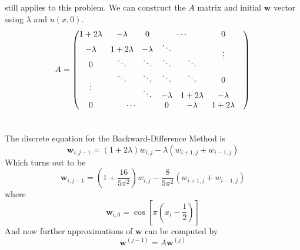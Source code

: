 \documentclass[12pt]{article}
\begin{document}
 still applies to this problem. We can construct the
$A$ matrix and initial $\mathbf{w}$ vector using $\lambda$ and $u(x,0)$.
\begin{equation}
  \label{eq:8b_A}
  \begin{aligned}
    A &=
    \begin{pmatrix}
      1+2\lambda & -\lambda    & 0       & \multicolumn{2}{c}{\cdots} & 0 \\
      -\lambda    & 1+2\lambda & -\lambda & \ddots &  & \multirow{2}{*}{\vdots} \\
      0 & \ddots & \ddots & \ddots & \ddots & & \\
      \multirow{2}{*}{\vdots} & \ddots & \ddots & \ddots & \ddots & 0 \\
      & & \ddots & -\lambda & 1+2\lambda & -\lambda \\
      0 & \multicolumn{2}{c}{\cdots} & 0 & -\lambda & 1+2\lambda \\
    \end{pmatrix} \\
    \\
  \end{aligned}
\end{equation}

The discrete equation for the Backward-Difference Method is
\begin{equation}
  \label{eq:8b_discrete}
  \mathbf{w}_{i,j-1}=(1+2\lambda)w_{i,j}-\lambda(w_{i+1,j}+w_{i-1,j})
\end{equation}
Which turns out to be 
\begin{equation}
  \label{eq:8b_discrete_val}
  \mathbf{w}_{i,j-1}=\left(1+\frac{16}{5\pi^2}\right)w_{i,j}-\frac{8}{5\pi^2}(w_{i+1,j}+w_{i-1,j})
\end{equation}
where 
\begin{equation}
  \label{eq:8b_w_i_0}
  \mathbf{w}_{i,0} = \cos\left[\pi\left(x_i-\frac{1}{2}\right)\right]
\end{equation}
And now further approximations of $\mathbf{w}$ can be computed by
\begin{equation}
  \label{eq:8b_wnext}
  \mathbf{w}^{(j-1)} = A\mathbf{w}^{(j)}
\end{equation}
\end{document}
